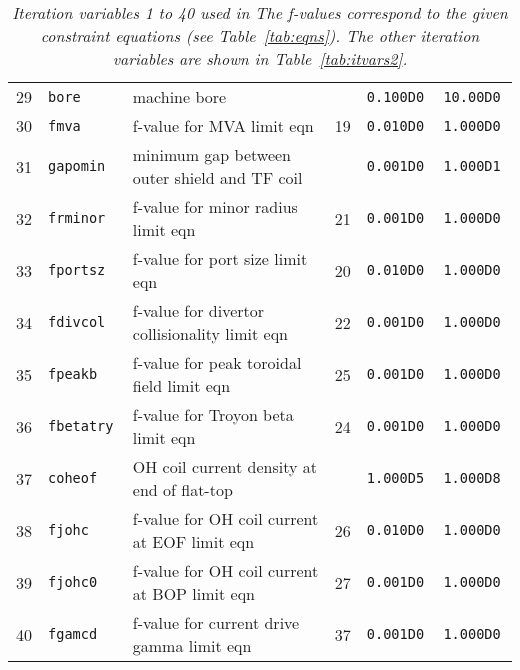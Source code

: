 \begin{table}[tbph]
\begin{center}
\begin{tabular}{||c|l|l|c|c|c||}
29  & \tt bore        & machine bore                                            &           & \tt 0.100D0  & \tt 10.00D0 \\
30  & \tt fmva        & f-value for MVA limit eqn                               & 19        & \tt 0.010D0  & \tt 1.000D0 \\
31  & \tt gapomin     & minimum gap between outer shield and TF coil            &           & \tt 0.001D0  & \tt 1.000D1 \\
32  & \tt frminor     & f-value for minor radius limit eqn                      & 21        & \tt 0.001D0  & \tt 1.000D0 \\
33  & \tt fportsz     & f-value for port size limit eqn                         & 20        & \tt 0.010D0  & \tt 1.000D0 \\
34  & \tt fdivcol     & f-value for divertor collisionality limit eqn           & 22        & \tt 0.001D0  & \tt 1.000D0 \\
35  & \tt fpeakb      & f-value for peak toroidal field limit eqn               & 25        & \tt 0.001D0  & \tt 1.000D0 \\
36  & \tt fbetatry    & f-value for Troyon beta limit eqn                       & 24        & \tt 0.001D0  & \tt 1.000D0 \\
37  & \tt coheof      & OH coil current density at end of flat-top              &           & \tt 1.000D5  & \tt 1.000D8 \\
38  & \tt fjohc       & f-value for OH coil current at EOF limit eqn            & 26        & \tt 0.010D0  & \tt 1.000D0 \\
39  & \tt fjohc0      & f-value for OH coil current at BOP limit eqn            & 27        & \tt 0.001D0  & \tt 1.000D0 \\
40  & \tt fgamcd      & f-value for current drive gamma limit eqn               & 37        & \tt 0.001D0  & \tt 1.000D0 \\ \hline
\end{tabular}
\end{center}
\caption[TABLE_VARS1]{{\it
Iteration variables 1 to 40 used in \PSD The f-values correspond to the
given constraint equations (see Table~\ref{tab:eqns}). The other iteration
variables are shown in Table~\ref{tab:itvars2}. }}
\label{tab:itvars1}
\end{table}
\normalsize

